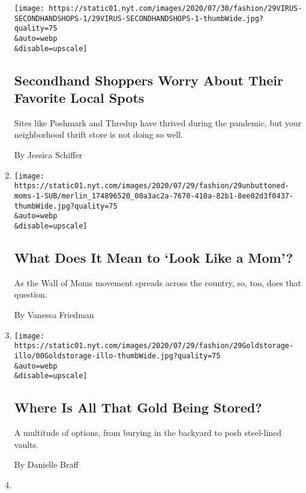 \begin{enumerate}
  \texttt{[image: https://static01.nyt.com/images/2020/07/30/fashion/29VIRUS-SECONDHANDSHOPS-1/29VIRUS-SECONDHANDSHOPS-1-thumbWide.jpg?quality=75\\\&auto=webp\\\&disable=upscale]}

  \hypertarget{secondhand-shoppers-worry-about-their-favorite-local-spots-1}{%
  \subsection{Secondhand Shoppers Worry About Their Favorite Local
  Spots}\label{secondhand-shoppers-worry-about-their-favorite-local-spots-1}}

  Sites like Poshmark and Thredup have thrived during the pandemic, but
  your neighborhood thrift store is not doing so well.

  By Jessica Schiffer
\item
  \href{/2020/07/28/style/wall-of-moms-image.html}{}

  \texttt{[image: https://static01.nyt.com/images/2020/07/29/fashion/29unbuttoned-moms-1-SUB/merlin\_174896520\_00a3ac2a-7670-418a-82b1-8ee02d3f0437-thumbWide.jpg?quality=75\\\&auto=webp\\\&disable=upscale]}

  \hypertarget{what-does-it-mean-to-look-like-a-mom-1}{%
  \subsection{What Does It Mean to `Look Like a
  Mom'?}\label{what-does-it-mean-to-look-like-a-mom-1}}

  As the Wall of Moms movement spreads across the country, so, too, does
  that question.

  By Vanessa Friedman
\item
  \href{/2020/07/28/style/gold-storage.html}{}

  \texttt{[image: https://static01.nyt.com/images/2020/07/29/fashion/29Goldstorage-illo/00Goldstorage-illo-thumbWide.jpg?quality=75\\\&auto=webp\\\&disable=upscale]}

  \hypertarget{where-is-all-that-gold-being-stored-1}{%
  \subsection{Where Is All That Gold Being
  Stored?}\label{where-is-all-that-gold-being-stored-1}}

  A multitude of options, from burying in the backyard to posh
  steel-lined vaults.

  By Danielle Braff
\item
  \href{/2020/07/28/style/malaysia-forced-labor-garment-workers.html}{}


\end{enumerate}
